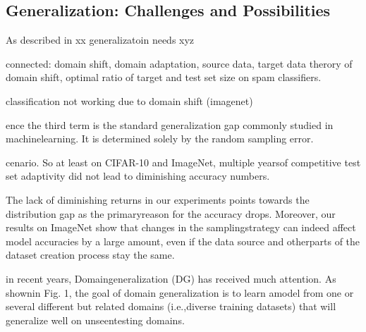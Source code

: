 


    \subsection{Generalization: Challenges and Possibilities} %


        As described in xx generalizatoin needs xyz

        connected: domain shift, domain adaptation, source data, target data
        \citep{ben2010theory} therory of domain shift, optimal ratio of target and test set size on spam classifiers.


        \citep{recht2019imagenet} classification not working due to domain shift (imagenet)

        \citep{recht2019imagenet}  ence the third term is the standard generalization gap commonly studied in machinelearning. It is determined solely by the random sampling error.

        \citep{recht2019imagenet}  cenario. So at least on CIFAR-10 and ImageNet, multiple yearsof competitive test set adaptivity did not lead to diminishing accuracy numbers.

        The lack of diminishing returns in our experiments points towards the distribution gap as the primaryreason for the accuracy drops. Moreover, our results on ImageNet show that changes in the samplingstrategy can indeed affect model accuracies by a large amount, even if the data source and otherparts of the dataset creation process stay the same. \citep{recht2019imagenet}


        \citep{wang2022generalizing} in recent years, Domaingeneralization (DG) has received much attention. As shownin Fig. 1, the goal of domain generalization is to learn amodel from one or several different but related domains (i.e.,diverse training datasets) that will generalize well on unseentesting domains.

